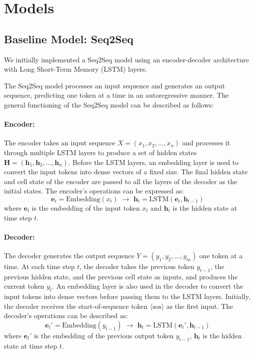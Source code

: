 \section{Models}
\subsection{Baseline Model: Seq2Seq}

We initially implemented a Seq2Seq model\cite{sutskever2014sequence} using an encoder-decoder architecture with Long Short-Term Memory (LSTM) layers\cite{lstm}.

The Seq2Seq model processes an input sequence and generates an output sequence, predicting one token at a time in an autoregressive manner. The general functioning of the Seq2Seq model can be described as follows:

\paragraph{Encoder:}
The encoder takes an input sequence \( X = (x_1, x_2, \ldots, x_n) \) and processes it through multiple LSTM layers to produce a set of hidden states \( \mathbf{H} = (\mathbf{h}_1, \mathbf{h}_2, \ldots, \mathbf{h}_n) \). Before the LSTM layers, an embedding layer is used to convert the input tokens into dense vectors of a fixed size. The final hidden state and cell state of the encoder are passed to all the layers of the decoder as the initial states. The encoder's operations can be expressed as:
\begin{equation}
    \mathbf{e}_t = \text{Embedding}(x_t) \,\, \rightarrow \,\, \mathbf{h}_t = \text{LSTM}(\mathbf{e}_t, \mathbf{h}_{t-1})
\end{equation}
where \( \mathbf{e}_t \) is the embedding of the input token \( x_t \) and \( \mathbf{h}_t \) is the hidden state at time step \( t \).

\paragraph{Decoder:}
The decoder generates the output sequence \( Y = (y_1, y_2, \ldots, y_m) \) one token at a time. At each time step \( t \), the decoder takes the previous token \( y_{t-1} \), the previous hidden state, and the previous cell state as inputs, and produces the current token \( y_t \). An embedding layer is also used in the decoder to convert the input tokens into dense vectors before passing them to the LSTM layers. Initially, the decoder receives the start-of-sequence token \( \langle \text{sos} \rangle \) as the first input. The decoder's operations can be described as:
\begin{equation}
    \mathbf{e}_t' = \text{Embedding}(y_{t-1}) \,\, \rightarrow \,\, \mathbf{h}_t = \text{LSTM}(\mathbf{e}_t', \mathbf{h}_{t-1})
\end{equation}
where \( \mathbf{e}_t' \) is the embedding of the previous output token \( y_{t-1} \), \( \mathbf{h}_t \) is the hidden state at time step \( t \).

